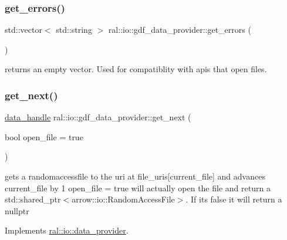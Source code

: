 \subsubsection{\texorpdfstring{get\+\_\+errors()}{get\_errors()}}
{\footnotesize\ttfamily std\+::vector$<$ std\+::string $>$ ral\+::io\+::gdf\+\_\+data\+\_\+provider\+::get\+\_\+errors (\begin{DoxyParamCaption}{ }\end{DoxyParamCaption})}

returns an empty vector. Used for compatiblity with apis that open files. \mbox{\label{classral_1_1io_1_1gdf__data__provider_a6770bc3c6f51365ecd3c7cc16babb7ff}} 
\subsubsection{\texorpdfstring{get\+\_\+next()}{get\_next()}}
{\footnotesize\ttfamily \hyperlink{structral_1_1io_1_1data__handle}{data\+\_\+handle} ral\+::io\+::gdf\+\_\+data\+\_\+provider\+::get\+\_\+next (\begin{DoxyParamCaption}\item[{bool}]{open\+\_\+file = {\ttfamily true} }\end{DoxyParamCaption})\hspace{0.3cm}{\ttfamily [virtual]}}

gets a randomaccessfile to the uri at file\+\_\+uris\mbox{[}current\+\_\+file\mbox{]} and advances current\+\_\+file by 1 open\+\_\+file = true will actually open the file and return a std\+::shared\+\_\+ptr$<$arrow\+::io\+::\+Random\+Access\+File$>$. If its false it will return a nullptr 

Implements \hyperlink{classral_1_1io_1_1data__provider_aa49cde8c92f3bc4e9fcbe2e8f34e7ba3}{ral\+::io\+::data\+\_\+provider}.

